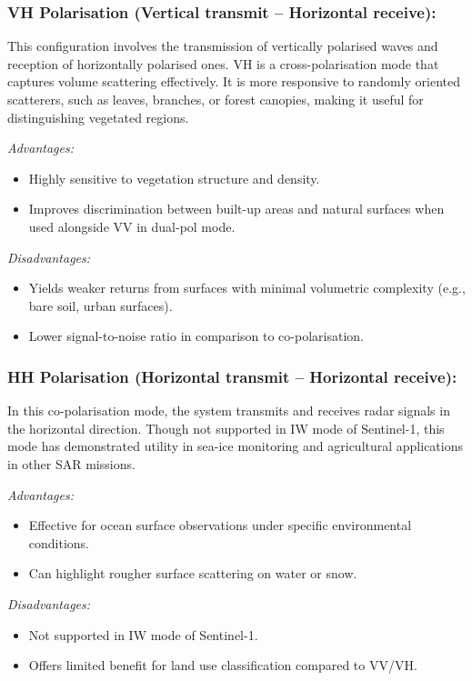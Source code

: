 \subsubsection{\textbf{VH Polarisation (Vertical transmit – Horizontal receive):}}

This configuration involves the transmission of vertically polarised waves and reception of horizontally polarised ones. VH is a cross-polarisation mode that captures volume scattering effectively. It is more responsive to randomly oriented scatterers, such as leaves, branches, or forest canopies, making it useful for distinguishing vegetated regions.


\textit{Advantages:}
\begin{itemize}
    \item Highly sensitive to vegetation structure and density.
    \item Improves discrimination between built-up areas and natural surfaces when used alongside VV in dual-pol mode.
\end{itemize}

\textit{Disadvantages:}
\begin{itemize}
    \item Yields weaker returns from surfaces with minimal volumetric complexity (e.g., bare soil, urban surfaces).
    \item Lower signal-to-noise ratio in comparison to co-polarisation.
\end{itemize}

\subsubsection{\textbf{HH Polarisation (Horizontal transmit – Horizontal receive):}}

In this co-polarisation mode, the system transmits and receives radar signals in the horizontal direction. Though not supported in IW mode of Sentinel-1, this mode has demonstrated utility in sea-ice monitoring and agricultural applications in other SAR missions.


\textit{Advantages:}
\begin{itemize}
    \item Effective for ocean surface observations under specific environmental conditions.
    \item Can highlight rougher surface scattering on water or snow.
\end{itemize}

\textit{Disadvantages:}
\begin{itemize}
    \item Not supported in IW mode of Sentinel-1.
    \item Offers limited benefit for land use classification compared to VV/VH.
\end{itemize}

